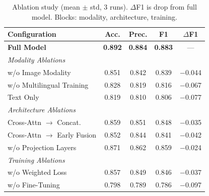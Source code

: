 \begin{table}[htbp]
\caption{Ablation study (mean $\pm$ std, 3 runs).
         $\Delta$F1 is drop from full model.
         Blocks: modality, architecture, training.}
\centering
\small
\setlength{\tabcolsep}{3pt}
\renewcommand{\arraystretch}{1.15}
\begin{tabular}{lcccc}
\toprule
\rowcolor{headerblue}
\textbf{Configuration} & \textbf{Acc.} & \textbf{Prec.}
                       & \textbf{F1} & \textbf{$\Delta$F1} \\
\midrule
\rowcolor{bestrow}
\textbf{Full Model}
    & \textbf{0.892} & \textbf{0.884}
    & \textbf{0.883} & --- \\
\midrule
\multicolumn{5}{l}{\textit{Modality Ablations}} \\
\midrule
w/o Image Modality
    & 0.851 & 0.842 & 0.839 & $-$0.044 \\
w/o Multilingual Training
    & 0.828 & 0.819 & 0.816 & $-$0.067 \\
Text Only
    & 0.819 & 0.810 & 0.806 & $-$0.077 \\
\midrule
\multicolumn{5}{l}{\textit{Architecture Ablations}} \\
\midrule
Cross-Attn $\rightarrow$ Concat.
    & 0.859 & 0.851 & 0.848 & $-$0.035 \\
Cross-Attn $\rightarrow$ Early Fusion
    & 0.852 & 0.844 & 0.841 & $-$0.042 \\
w/o Projection Layers
    & 0.871 & 0.862 & 0.859 & $-$0.024 \\
\midrule
\multicolumn{5}{l}{\textit{Training Ablations}} \\
\midrule
w/o Weighted Loss
    & 0.857 & 0.849 & 0.846 & $-$0.037 \\
w/o Fine-Tuning
    & 0.798 & 0.789 & 0.786 & $-$0.097 \\
\bottomrule
\end{tabular}
\label{tab:ablation}
\end{table}

